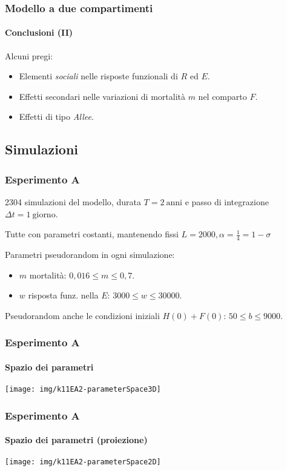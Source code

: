 \documentclass[]{beamer}
\begin{document}
\begin{frame}
    \frametitle{Modello a due compartimenti}
    \framesubtitle{Conclusioni (II)}

    Alcuni pregi:
    \begin{itemize}
        \item \pause Elementi \emph{sociali} nelle risposte funzionali di $R$ ed $E$.
        \item \pause Effetti secondari nelle variazioni di mortalità $m$ nel comparto $F$.
        \item \pause Effetti di tipo \emph{Allee}.
    \end{itemize}
\end{frame}


\subsection{Simulazioni}


\begin{frame}
    \frametitle{Esperimento A}

    2304 simulazioni del modello,
    durata $T=2~\text{anni}$ e passo di integrazione $\Delta t= 1~\text{giorno}$.

    \pause
    Tutte con parametri costanti, mantenendo fissi $L=2000, \alpha = \frac{1}{4} = 1-\sigma$

    \pause
    Parametri pseudorandom in ogni simulazione:
    \begin{itemize}
        \item $m$ mortalità: \pause $0,016 \leq m \leq 0,7$.
        \item \pause $w$ risposta funz. nella $E$: \pause $3000 \leq w \leq 30000$.
    \end{itemize}
    \pause
    Pseudorandom anche le condizioni iniziali $H(0)+F(0)$: \pause $50 \leq b \leq 9000$.
\end{frame}

\begin{frame}
    \frametitle{Esperimento A}
    \framesubtitle{Spazio dei parametri}

    \begin{center}
        \texttt{[image: img/k11EA2-parameterSpace3D]}
    \end{center}
\end{frame}

\begin{frame}
    \frametitle{Esperimento A}
    \framesubtitle{Spazio dei parametri (proiezione)}

    \begin{center}
        \texttt{[image: img/k11EA2-parameterSpace2D]}
    \end{center}
\end{frame}
\end{document}
